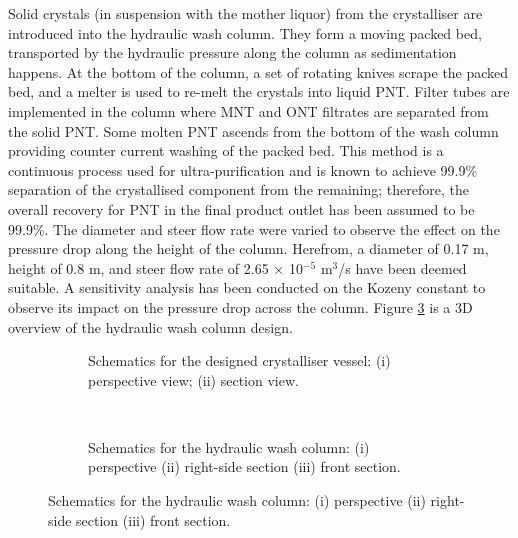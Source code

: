 Solid crystals (in suspension with the mother liquor) from the crystalliser are introduced into the hydraulic wash column. They form a moving packed bed, transported by the hydraulic pressure along the column as sedimentation happens. At the bottom of the column, a set of rotating knives scrape the packed bed, and a melter is used to re-melt the crystals into liquid PNT. Filter tubes are implemented in the column where MNT and ONT filtrates are separated from the solid PNT. Some molten PNT ascends from the bottom of the wash column providing counter current washing of the packed bed. This method is a continuous process used for ultra-purification and is known to achieve 99.9\% separation of the crystallised component from the remaining; therefore, the overall recovery for PNT in the final product outlet has been assumed to be 99.9\%. The diameter and steer flow rate were varied to observe the effect on the pressure drop along the height of the column. Herefrom, a diameter of 0.17 m, height of 0.8 m, and steer flow rate of 2.65 $\times$ 10$^{-5}$ m$^{3}$/s have been deemed suitable. A sensitivity analysis has been conducted on the Kozeny constant to observe its impact on the pressure drop across the column. Figure \ref{fig:wash column schematic executive} is a 3D overview of the hydraulic wash column design.


\begin{figure}[h]
    \centering
    \begin{subfigure}[h]{0.5\textwidth}
    \centering
    
    \caption{Schematics for the designed crystalliser vessel: (i) perspective view; (ii) section view.}
    \label{fig:crystalliser schematic executive}
    \end{subfigure}%
    ~ 
    \begin{subfigure}[h]{0.5\textwidth}
    \centering
    
    \caption{Schematics for the hydraulic wash column: (i) perspective (ii) right-side section (iii) front section.}
    \label{fig:wash column schematic executive}
    \end{subfigure}
\end{figure}

